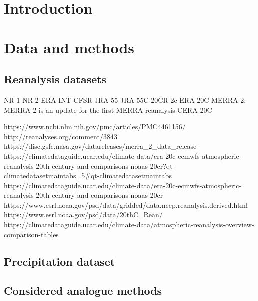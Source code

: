 \documentclass{ametsoc}
\begin{document}



\section{Introduction}

\section{Data and methods}

\subsection{Reanalysis datasets}



NR-1 \citep{Kalnay1996, Kistler2001}
NR-2 \citep{Kanamitsu2002}
ERA-INT \citep{Dee2011a}
CFSR \citep{Saha2010a}
JRA-55 \citep{Kobayashi2015, Harada2016}
JRA-55C
20CR-2c \citep{Compo2011}
ERA-20C \citep{Poli2016}
MERRA-2. MERRA-2 is an update for the first MERRA reanalysis \citep{Rienecker2011}
CERA-20C





https://www.ncbi.nlm.nih.gov/pmc/articles/PMC4461156/
http://reanalyses.org/comment/3843
https://disc.gsfc.nasa.gov/datareleases/merra_2_data_release
https://climatedataguide.ucar.edu/climate-data/era-20c-ecmwfs-atmospheric-reanalysis-20th-century-and-comparisons-noaas-20cr?qt-climatedatasetmaintabs=5#qt-climatedatasetmaintabs
https://climatedataguide.ucar.edu/climate-data/era-20c-ecmwfs-atmospheric-reanalysis-20th-century-and-comparisons-noaas-20cr
https://www.esrl.noaa.gov/psd/data/gridded/data.ncep.reanalysis.derived.html
https://www.esrl.noaa.gov/psd/data/20thC_Rean/
https://climatedataguide.ucar.edu/climate-data/atmospheric-reanalysis-overview-comparison-tables



\subsection{Precipitation dataset}


\subsection{Considered analogue methods}
\end{document}
